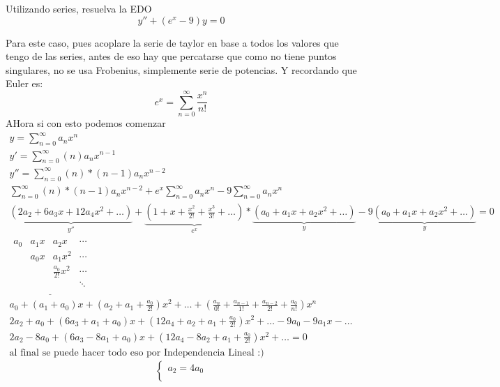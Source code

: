 \begin{prob}
Utilizando series, resuelva la EDO
$$y'' + (e^x - 9)y = 0$$
\end{prob}
\begin{mdframed}
    Para este caso, pues acoplare la serie de taylor en base a todos los valores que tengo de las series, antes de eso hay que percatarse que como no tiene puntos singulares, no se usa Frobenius, simplemente serie de potencias. Y recordando que Euler es:
    $$e^x = \sum_{n=0}^{\infty} \frac{x^n}{n!}$$
    AHora si con esto podemos comenzar
    \begin{gather*}
        y = \sum_{n=0}^{\infty}   a_n x^{n}\\
        y' = \sum_{n=0}^{\infty}  ({n}) a_n x^{n-1}\\
        y'' = \sum_{n=0}^{\infty}  ({n})*({n-1}) a_n x^{n-2}\\
         \sum_{n=0}^{\infty}  ({n})*({n-1}) a_n x^{n-2} + e^x \sum_{n=0}^{\infty} a_n x^{n}-9\sum_{n=0}^{\infty} a_n x^{n}\\
        \underbrace{(2a_2+6a_3x+12a_4x^2+\dots)}_{y''}+\underbrace{(1+x+\frac{x^2}{2!}+\frac{x^3}{3!}+\dots)}_{e^x}*\underbrace{(a_0+a_1x+a_2x^2+\dots)}_{y}-9\underbrace{(a_0+a_1x+a_2x^2+\dots)}_{y}=0\\
        \underline{\begin{matrix}
        a_0 & a_1x & a_2x & \cdots\\
         & a_0x & a_1x^2 & \cdots \\
         &     & \frac{a_0}{2!}x^2 & \cdots \\
         &     &  & \ddots \\
        \end{matrix}}\\
        a_0+(a_1+a_0)x+(a_2+a_1+\frac{a_0}{2!})x^2+\dots+\left(\frac{a_n}{0!}+\frac{a_{n-1}}{1!}+\frac{a_{n-2}}{2!}+\frac{a_{0}}{{n}!} \right)x^n\\
        2a_2+a_0+(6a_3+a_1+a_0)x+(12a_4+a_2+a_1+\frac{a_0}{2!})x^2+\dots - 9a_0-9a_1x-\dots\\
        2a_2-8a_0+(6a_3-8a_1+a_0)x+(12a_4-8a_2+a_1+\frac{a_0}{2!})x^2+\dots =0\\
        \text{al final se puede hacer todo eso por Independencia Lineal :)}
    \end{gather*}
          \begin{equation}
                \begin{cases}
                   a_2=4a_0\\

\end{cases}
\end{equation}
\end{mdframed}
